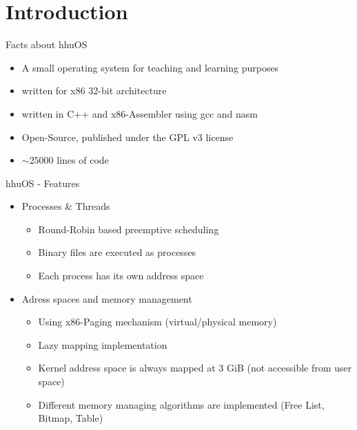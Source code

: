 \section{Introduction}
	
	\begin{frame}{Facts about hhuOS}
	\begin{itemize}
		\setlength\itemsep{1em}
		\item A small operating system for teaching and learning purposes
		\item written for x86 32-bit architecture
		\item written in C++ and x86-Assembler using gcc and nasm
		\item Open-Source, published under the GPL v3 license
		\item $\sim25000$ lines of code
	\end{itemize}
	\end{frame}
	
	\begin{frame}{hhuOS - Features}
		\begin{itemize}
			\item Processes \& Threads
			\begin{itemize}
				\item Round-Robin based preemptive scheduling
				\item Binary files are executed as processes
				\item Each process has its own address space
			\end{itemize}
			\pause
			\item Adress spaces and memory management
			\begin{itemize}
				\item Using x86-Paging mechanism (virtual/physical memory)
				\item Lazy mapping implementation
				\item Kernel address space is always mapped at 3 GiB (not accessible from user space)
				\item Different memory managing algorithms are implemented (Free List, Bitmap, Table)
			\end{itemize}
		\end{itemize}
	\end{frame}

